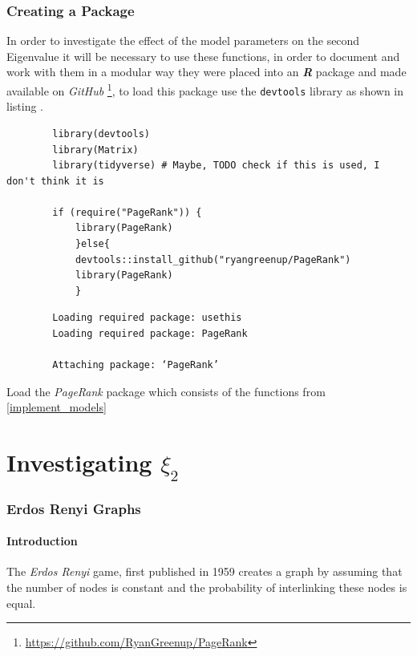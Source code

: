 \documentclass[11pt]{report}
\begin{document}
\begin{enumerate}
\end{enumerate}

\section{Creating a Package}
\label{create-package}
In order to investigate the effect of the model parameters on the second
Eigenvalue it will be necessary to use these functions, in order to document and
work with them in a modular way they were placed into an \textbf{\emph{R}} package and made
available on \emph{GitHub}  \footnote{\url{https://github.com/RyanGreenup/PageRank}}, to load this package use the \texttt{devtools} library as shown in listing .

\begin{listing}[htbp]
    \begin{tcolorbox}
        \begin{verbatim}
        library(devtools)
        library(Matrix)
        library(tidyverse) # Maybe, TODO check if this is used, I don't think it is

        if (require("PageRank")) {
            library(PageRank)
            }else{
            devtools::install_github("ryangreenup/PageRank")
            library(PageRank)
            }

        \end{verbatim}
    \tcblower
        \begin{verbatim}
        Loading required package: usethis
        Loading required package: PageRank

        Attaching package: ‘PageRank’
        \end{verbatim}
    \end{tcolorbox}
\caption{\label{}Load the \emph{PageRank} package which consists of the functions from \ref{implement_models}}
\end{listing}



\part{Investigating \(\xi_{2}\)}
\section{Erdos Renyi Graphs}
\label{erdos-renyi}
\subsection{Introduction}
\label{sec:org56225bf}
The \emph{Erdos Renyi} game, first published in 1959 \cite{renyiRandomGraphs1959} creates a graph by assuming that the number of nodes is constant and the probability of interlinking these nodes is equal.
\end{document}

